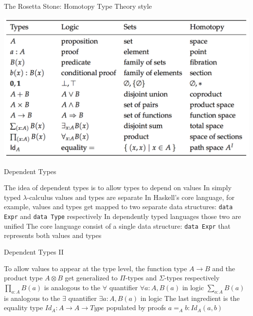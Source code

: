 \documentclass[pdf]{beamer}
\begin{document}
\begin{frame}{The Rosetta Stone: Homotopy Type Theory style}
  \begin{center}
    \includegraphics[scale=0.47]{images/hott}
  \end{center}
\end{frame}

\begin{frame}{Dependent Types}
  \begin{outline}
    \1 The idea of dependent types is to allow types to depend on values
    \pause
    \1 In simply typed $\lambda$-calculus values and types are separate
    \pause
    \1 In Haskell's core language, for example, values and types get mapped to two separate data structures: \texttt{data Expr} and \texttt{data Type} respectively
    \pause
    \1 In dependently typed languages those two are unified
    \pause
    \1 The core language consist of a single data structure: \texttt{data Expr} that represents both values and types
  \end{outline}
\end{frame}

\begin{frame}{Dependent Types II}
  \begin{outline}
    \1 To allow values to appear at the type level, the function type $A \to B$ and the product type $A \otimes B$ get generalized to $\Pi$-types and $\Sigma$-types respectively
    \pause
    \1 $\prod_{a : A}{B(a)}$ is analogous to the $\forall$ quantifier $\forall a : A, B(a)$ in logic
    \1 $\sum_{a : A}{B(a)}$ is analogous to the $\exists$ quantifier $\exists a : A, B(a)$ in logic
    \pause
    \1 The last ingredient is the equality type $Id_{A} : A \to A \to Type$ populated by proofs $a =_{A} b : Id_{A}(a, b)$
  \end{outline}
\end{frame}
\end{document}
